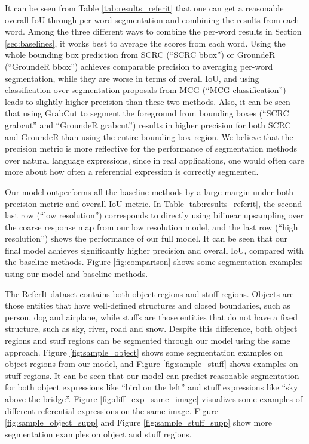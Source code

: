\documentclass[runningheads]{llncs}
\begin{document}
It can be seen from Table \ref{tab:results_referit} that one can get a reasonable overall IoU through per-word segmentation and combining the results from each word. Among the three different ways to combine the per-word results in Section \ref{sec:baselines}, it works best to average the scores from each word. Using the whole bounding box prediction from SCRC \cite{hu2015natural} (``SCRC bbox'') or GroundeR \cite{rohrbach2015grounding} (``GroundeR bbox'') achieves comparable precision to averaging per-word segmentation, while they are worse in terms of overall IoU, and using classification over segmentation proposals from MCG (``MCG classification'') leads to slightly higher precision than these two methods. Also, it can be seen that using GrabCut \cite{rother2004grabcut} to segment the foreground from bounding boxes (``SCRC grabcut'' and ``GroundeR grabcut'') results in higher precision for both SCRC and GroundeR than using the entire bounding box region. We believe that the precision metric is more reflective for the performance of segmentation methods over natural language expressions, since in real applications, one would often care more about how often a referential expression is correctly segmented.

Our model outperforms all the baseline methods by a large margin under both precision metric and overall IoU metric. In Table \ref{tab:results_referit}, the second last row (``low resolution'') corresponds to directly using bilinear upsampling over the coarse response map from our low resolution model, and the last row (``high resolution'') shows the performance of our full model. It can be seen that our final model achieves significantly higher precision and overall IoU, compared with the baseline methods. Figure \ref{fig:comparison} shows some segmentation examples using our model and baseline methods.

The ReferIt dataset contains both object regions and stuff regions. Objects are those entities that have well-defined structures and closed boundaries, such as person, dog and airplane, while stuffs are those entities that do not have a fixed structure, such as sky, river, road and snow. Despite this difference, both object regions and stuff regions can be segmented through our model using the same approach. Figure \ref{fig:sample_object} shows some segmentation examples on object regions from our model, and Figure \ref{fig:sample_stuff} shows examples on stuff regions. It can be seen that our model can predict reasonable segmentation for both object expressions like ``bird on the left'' and stuff expressions like ``sky above the bridge''. Figure \ref{fig:diff_exp_same_image} visualizes some examples of different referential expressions on the same image. Figure \ref{fig:sample_object_supp} and Figure \ref{fig:sample_stuff_supp} show more segmentation examples on object and stuff regions.
\end{document}
